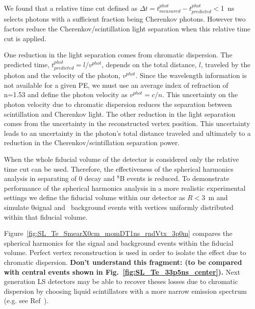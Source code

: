 We found that a relative time cut defined as $\Delta t=t^{phot}_{measured} -
t^{phot}_{predicted}<$1~ns selects photons with a sufficient fraction being
Cherenkov photons. However two factors reduce the Cherenkov/scintillation light separation when this relative time cut is applied.

One reduction in the light separation comes from chromatic dispersion. The predicted time, $ t^{phot}_{predicted}=l/v^{phot}$, depends on the total distance, $l$, traveled by the photon and the velocity of the photon, $v^{phot}$.  Since the wavelength information is not available for a given PE, we must use an average index of refraction of n=1.53 and define the photon velocity as $v^{phot} = c/n$. This uncertainty on the photon velocity due to chromatic dispersion reduces the separation between scintillation and Cherenkov light. The other reduction in the light separation comes from the uncertainty in the reconstructed vertex position. This uncertainty leads to an uncertainty in the photon's total distance traveled and ultimately to a reduction in the Cherenkov/scintillation separation power.

When the whole fiducial volume of the detector is considered only the relative time cut can be used. Therefore, the effectiveness of the spherical harmonics analysis in separating of 0{\nbb} decay and $^{8}$B events is reduced. To demonstrate performance of the spherical harmonics analysis in a  more realistic experimental settings we define the fiducial volume within our detector as $R<3$~m and simulate 0\nbb signal and \B~background events with vertices uniformly distributed within that fiducial volume.

Figure~\ref{fig:SL_Te_SmearX0cm_momDT1ns_rndVtx_3p0m} compares the spherical harmonics for the signal and background events within the fiducial volume. Perfect vertex reconstruction is used in order to isolate the effect due to chromatic dispersion.   {\bf Don't understand this fragment: (to be compared with central events shown in Fig.~\ref{fig:SL_Te_33p5ns_center}).} Next generation LS detectors may be able to recover theses losses due to chromatic dispersion by choosing liquid scintillators with a more narrow emission spectrum (e.g. see Ref~\cite{LS_narrow_emission}).

